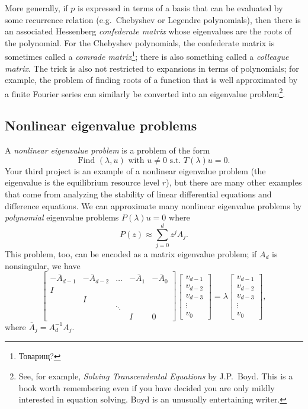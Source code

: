 \documentclass[12pt, leqno]{article} %
\begin{document}
More generally, if $p$ is expressed in terms of a basis that can be
evaluated by some recurrence relation (e.g.~Chebyshev or Legendre
polynomials), then there is an associated Hessenberg {\em confederate
  matrix} whose eigenvalues are the roots of the polynomial.  For the
Chebyshev polynomials, the confederate matrix is sometimes called a
{\em comrade matrix}\footnote{Товарищ?}; there is also something
called a {\em colleague matrix}.  The trick is also not restricted to
expansions in terms of polynomials; for example, the problem of
finding roots of a function that is well approximated by a finite
Fourier series can similarly be converted into an eigenvalue
problem\footnote{%
  See, for example, {\em Solving Transcendental Equations} by
  J.P.~Boyd.  This is a book worth remembering even if you have
  decided you are only mildly interested in equation solving.
  Boyd is an unusually entertaining writer.
}.

\subsection*{Nonlinear eigenvalue problems}

A {\em nonlinear eigenvalue problem} is a problem of the form
\[
  \mbox{Find } (\lambda, u) \mbox{ with } u \neq 0 \mbox{ s.t.~}
  T(\lambda) u = 0.
\]
Your third project is an example of a nonlinear eigenvalue problem
(the eigenvalue is the equilibrium resource level $r$), but there are
many other examples that come from analyzing the stability of linear
differential equations and difference equations.  We can approximate
many nonlinear eigenvalue problems by {\em polynomial} eigenvalue
problems $P(\lambda) u = 0$ where
\[
  P(z) \approx \sum_{j=0}^d z^j A_j.
\]
This problem, too, can be encoded as a matrix eigenvalue problem;
if $A_d$ is nonsingular, we have
\[
\begin{bmatrix}
  -\bar{A}_{d-1} & -\bar{A}_{d-2} & \ldots & -\bar{A}_{1} & -\bar{A}_{0} \\
  I \\
    & I \\
    &   & \ddots \\
    &   &   & I & 0
\end{bmatrix}
\begin{bmatrix}
  v_{d-1} \\ v_{d-2} \\ v_{d-3} \\ \vdots \\ v_0
\end{bmatrix} =
\lambda
\begin{bmatrix}
  v_{d-1} \\ v_{d-2} \\ v_{d-3} \\ \vdots \\ v_0
\end{bmatrix},
\]
where $\bar{A}_j = A_d^{-1} A_j$.
\end{document}
